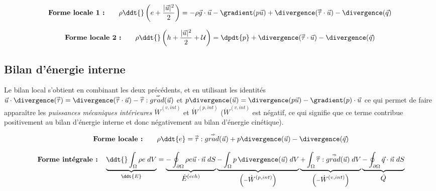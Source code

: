 \begin{equation}
\mbox{\bf Forme locale 1 :} \qquad 
		\rho \ddt{} \left( e+ \frac{|\vec{u}|^2}{2} \right) 
		= -\rho \vec{g} \cdot \vec{u} 
		- \gradient ( p  \vec{u} ) 
		+ \divergence ( \mytensor{\tau} \cdot \vec{u} ) 
		 - \divergence(\vec{q})
\end{equation}



\begin{equation}
\mbox{\bf Forme locale 2 :} \qquad 
		\rho \ddt{} \left( h + \frac{|\vec{u}|^2}{2} + {\cal U} \right) 
		=
		 \dpdt{p}
		+ \divergence ( \mytensor{\tau} \cdot \vec{u} ) 
		 - \divergence(\vec{q})
\end{equation}


\subsection{Bilan d'énergie interne}
Le bilan local s'obtient en combinant les deux précédents, et en utilisant les identités $ \vec{u} \cdot \divergence ( \mytensor{\tau} ) =  \divergence ( \mytensor{\tau} \cdot \vec{u} ) -  \mytensor{\tau} : \mytensor{grad}(\vec{u})$
 et $ p \divergence (\vec u) = \divergence( p \vec u) - \gradient(p) \cdot \vec u$ ce qui permet de faire apparaître les {\em puissances mécaniques intérieures} $\dot W^{(v,int)}$ et $\dot W^{(p,int)}$ ($\dot W^{(v,int)}$ est négatif, ce qui signifie que ce terme contribue positivement au bilan d'énergie interne et donc négativement au bilan d'énergie cinétique).



\begin{equation}
\mbox{ \bf Forme locale :} \qquad
		\rho \ddt{e} 
		= \mytensor{\tau} : \mytensor{grad}(\vec{u}) + 
		p \divergence( \vec{u})
		 - \divergence(\vec{q})
\end{equation}


	\begin{equation*}
	\mbox{ \bf Forme intégrale :} \quad 
		\underbrace{\ddt{} \int_{\Omega} \rho e \; dV}_{\ddt{E}}  
		= 
		\underbrace{ - \oint_{\partial \Omega}  \rho e \vec{u} \cdot \vec{n} \; dS}_{\displaystyle \dot E^{(ech)}}
		\underbrace{- \int_{\Omega} p \, \divergence (\vec{u}) \; dV }_{\left( - \displaystyle \dot W^{(p,int)} \right) }
		\underbrace{+ \int_{\Omega} \mytensor{\tau} : \mytensor{grad}(\vec{u})  \; dV
		}_{\left( - \displaystyle \dot W^{(v,int)} \right)}
		\underbrace{- \oint_{\partial \Omega} \vec{q} \cdot \vec{n} \; dS}_{\displaystyle \dot{Q}}
		\label{eq:bilan_global_eulerien_e}
	\end{equation*}



